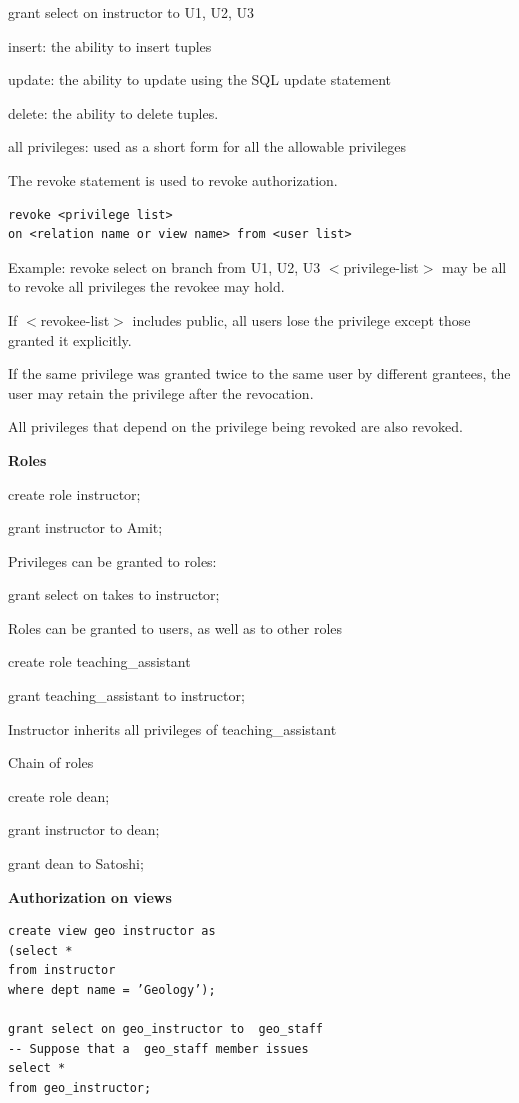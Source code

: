 \documentclass[8pt, a4paper, oneside, twocolumn]{extarticle}
\begin{document}
            grant select on instructor to U1, U2, U3

insert: the ability to insert tuples

update: the ability  to update using the SQL update statement

delete: the ability to delete tuples.

all privileges: used as a short form for all the allowable privileges

The revoke statement is used to revoke authorization.
\begin{verbatim}
revoke <privilege list>
on <relation name or view name> from <user list>
\end{verbatim}

Example:
revoke select on branch  from U1, U2, U3
$<$privilege-list$>$ may be all to revoke all privileges the revokee may hold.

If $<$revokee-list$>$ includes public, all users lose the privilege except those granted it explicitly.

If the same privilege was granted twice to the same user by different grantees, the user may retain the privilege after the revocation.

All privileges that depend on the privilege being revoked are also revoked.

\textbf{Roles}

create role instructor;

grant instructor to Amit;

Privileges can be granted to roles:

grant select on takes to instructor;

Roles can be granted to users, as well as to other roles

create role teaching\_assistant

grant teaching\_assistant to instructor;

Instructor inherits all privileges of teaching\_assistant

Chain of roles

create role dean;

grant instructor to dean;

grant dean to Satoshi;

\textbf{Authorization on views}

\begin{verbatim}
create view geo instructor as
(select *
from instructor
where dept name = ’Geology’);

grant select on geo_instructor to  geo_staff
-- Suppose that a  geo_staff member issues
select *
from geo_instructor;
\end{verbatim}
\end{document}
